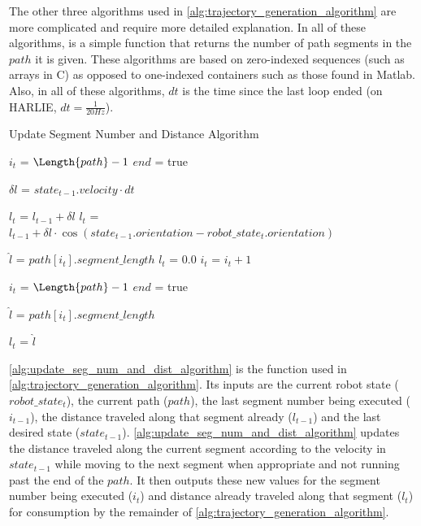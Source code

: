 
The other three algorithms used in \autoref{alg:trajectory_generation_algorithm} are more complicated and require more detailed explanation. In all of these algorithms, \Length is a simple function that returns the number of path segments in the $path$ it is given. These algorithms are based on zero-indexed sequences (such as arrays in C) as opposed to one-indexed containers such as those found in Matlab. Also, in all of these algorithms, $dt$ is the time since the last loop ended (on HARLIE, $dt = \frac{1}{20 Hz}$).

\begin{algorithm}
\caption{Update Segment Number and Distance Algorithm}
\label{alg:update_seg_num_and_dist_algorithm}
\DontPrintSemicolon


{
	$i_t$ = $\Length{path}-1$ \;
	$end$ = true \;
}

$\delta l$ = $state_{t-1}.velocity \cdot dt$ \;

{
	$l_t$ = $l_{t-1} + \delta l$ \;	
}
{
	$l_t$ = $l_{t-1} + \delta l \cdot \cos\left(state_{t-1}.orientation - robot\_state_t.orientation\right) $ \; 
}

$\hat l$ = $path\left[i_t\right].segment\_length$ \;
{
	$l_t$ = $0.0$ \;
	$i_t$ = $i_t + 1$ \;
}

{
	$i_t$ = $\Length{path}-1$ \;
	$end$ = true \;
}

$\hat l$ = $path\left[i_t\right].segment\_length$ \; 

{
	$l_t$ = $\hat l$ \;
}

\end{algorithm}

\autoref{alg:update_seg_num_and_dist_algorithm} is the \UpdateSegmentNumberAndDistance function used in \autoref{alg:trajectory_generation_algorithm}. Its inputs are the current robot state ($robot\_state_t$), the current path ($path$), the last segment number being executed ($i_{t-1}$), the distance traveled along that segment already ($l_{t-1}$) and the last desired state ($state_{t-1}$). \autoref{alg:update_seg_num_and_dist_algorithm} updates the distance traveled along the current segment according to the velocity in $state_{t-1}$ while moving to the next segment when appropriate and not running past the end of the $path$. It then outputs these new values for the segment number being executed ($i_t$) and distance already traveled along that segment ($l_t$) for consumption by the remainder of \autoref{alg:trajectory_generation_algorithm}.

